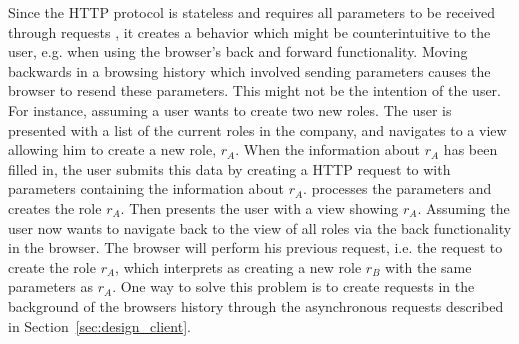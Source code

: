 Since the HTTP protocol is stateless and requires all parameters to be received through requests \citep{python_stateless}, it creates a behavior which might be counterintuitive to the user, e.g. when using the browser's back and forward functionality.
Moving backwards in a browsing history which involved sending parameters causes the browser to resend these parameters.
This might not be the intention of the user.
For instance, assuming a user wants to create two new roles.
The user is presented with a list of the current roles in the company, and navigates to a view allowing him to create a new role, $r_A$.
When the information about $r_A$ has been filled in, the user submits this data by creating a HTTP request to  with parameters containing the information about $r_A$.
 processes the parameters and creates the role $r_A$.
Then  presents the user with a view showing $r_A$.
Assuming the user now wants to navigate back to the view of all roles via the back functionality in the browser.
The browser will perform his previous request, i.e. the request to create the role $r_A$, which  interprets as creating a new role $r_B$ with the same parameters as $r_A$.
One way to solve this problem is to create requests in the background of the browsers history through the asynchronous requests described in Section~\ref{sec:design_client}.
